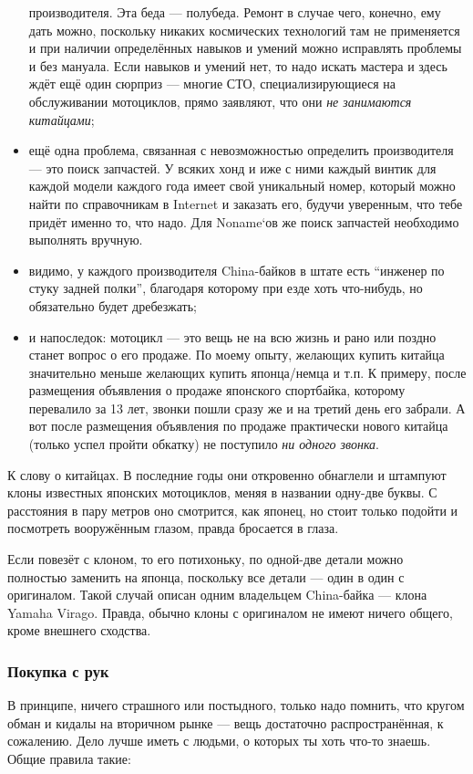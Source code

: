 \documentclass[12pt,a4paper]{article}
\begin{document}
\begin{itemize}
производителя. Эта беда --- полубеда. Ремонт в случае чего, конечно,
ему дать можно, поскольку никаких космических технологий там не
применяется и при наличии определённых навыков и умений можно
исправлять проблемы и без мануала. Если навыков и умений нет, то
надо искать мастера и здесь ждёт ещё один сюрприз --- многие СТО,
специализирующиеся на обслуживании мотоциклов, прямо заявляют,
что они \emph{не занимаются китайцами};
\item ещё одна проблема, связанная с невозможностью определить
производителя --- это поиск запчастей. У всяких хонд и иже с ними
каждый винтик для каждой модели каждого года имеет свой уникальный
номер, который можно найти по справочникам в Internet и заказать
его, будучи уверенным, что тебе придёт именно то, что надо. Для
Noname`ов же поиск запчастей необходимо выполнять вручную.
\item видимо, у каждого производителя China-байков в штате есть ``инженер
по стуку задней полки'', благодаря которому при езде хоть что-нибудь,
но обязательно будет дребезжать;
\item и напоследок: мотоцикл --- это вещь не на всю жизнь и рано или
поздно станет вопрос о его продаже. По моему опыту, желающих купить
китайца значительно меньше желающих купить японца/немца и т.п. К
примеру, после размещения объявления о продаже японского спортбайка,
которому перевалило за 13 лет, звонки пошли сразу же и на третий день
его забрали. А вот после размещения объявления по продаже практически
нового китайца (только успел пройти обкатку) не поступило
\emph{ни одного звонка}.
\end{itemize}

К слову о китайцах. В последние годы они откровенно обнаглели и
штампуют клоны известных японских мотоциклов, меняя в названии одну-две
буквы. С расстояния в пару метров оно смотрится, как японец, но стоит
только подойти и посмотреть вооружённым глазом, правда бросается в
глаза.

Если повезёт с клоном, то его потихоньку, по одной-две детали можно
полностью заменить на японца, поскольку все детали --- один в один с
оригиналом. Такой случай описан одним владельцем China-байка ---
клона Yamaha Virago. Правда, обычно клоны с оригиналом не имеют ничего
общего, кроме внешнего сходства.

\subsubsection{Покупка с рук}

В принципе, ничего страшного или постыдного, только надо помнить,
что кругом обман и кидалы на вторичном рынке --- вещь достаточно
распространённая, к сожалению. Дело лучше иметь с людьми, о которых
ты хоть что-то знаешь. Общие правила такие:
\end{document}
